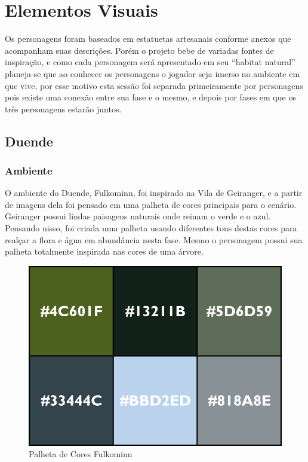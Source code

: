 
\section{Elementos Visuais}
Os personagens foram baseados em estatuetas artesanais conforme anexos que acompanham suas descrições. Porém o projeto bebe de variadas fontes de inspiração, e como cada personagem será apresentado em seu ``habitat natural'' planeja-se que ao conhecer os personagens o jogador seja imerso no ambiente em que vive, por esse motivo esta sessão foi separada primeiramente por personagens pois existe uma conexão entre sua fase e o mesmo, e depois por fases em que os três personagens estarão juntos.

\subsection{Duende}
\subsubsection{Ambiente}
O ambiente do Duende, Fulkominn, foi inspirado na Vila de Geiranger, e a partir de imagens dela foi pensado em uma palheta de cores principais para o cenário. Geiranger possui lindas paisagens naturais onde reinam o verde e o azul. Pensando nisso, foi criada uma palheta usando diferentes tons destas cores para realçar a flora e água em abundância nesta fase. Mesmo o personagem possui sua palheta totalmente inspirada nas cores de uma árvore.

\begin{figure}[htb]
	\caption{\label{fig_palhetaFulkominn}Palheta de Cores Fulkominn}
	\begin{center}
	    \includegraphics[width=\textwidth/2]{imagens/PaletaGeiranger.png}
	\end{center}
\end{figure}

